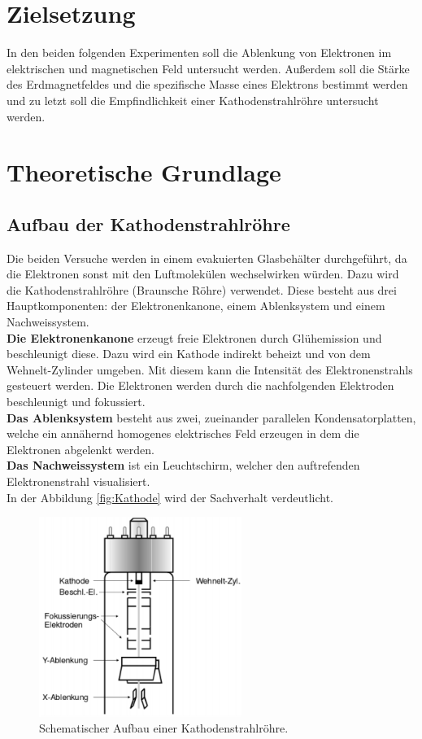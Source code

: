 \section{Zielsetzung}
In den beiden folgenden Experimenten soll die Ablenkung von Elektronen im elektrischen und magnetischen Feld untersucht werden. Außerdem soll die Stärke des Erdmagnetfeldes und die spezifische Masse eines Elektrons bestimmt werden und zu letzt soll die Empfindlichkeit einer Kathodenstrahlröhre untersucht werden.

\section{Theoretische Grundlage}
\label{sec:Theorie}
\subsection{Aufbau der Kathodenstrahlröhre}
Die beiden Versuche werden in einem evakuierten Glasbehälter durchgeführt, da die Elektronen sonst mit den Luftmolekülen wechselwirken würden. Dazu wird die Kathodenstrahlröhre (Braunsche Röhre) verwendet. Diese besteht aus drei Hauptkomponenten: der Elektronenkanone, einem Ablenksystem und einem Nachweissystem.\\
\textbf{Die Elektronenkanone} erzeugt freie Elektronen durch Glühemission und beschleunigt diese. Dazu wird ein Kathode indirekt beheizt und von dem Wehnelt-Zylinder umgeben. Mit diesem kann die Intensität des Elektronenstrahls gesteuert werden. Die Elektronen werden durch die nachfolgenden Elektroden beschleunigt und fokussiert. \\
\textbf{Das Ablenksystem} besteht aus zwei, zueinander parallelen Kondensatorplatten, welche ein annähernd homogenes elektrisches Feld erzeugen in dem die Elektronen abgelenkt werden. \\
\textbf{Das Nachweissystem} ist ein Leuchtschirm, welcher den auftrefenden Elektronenstrahl visualisiert.\\
In der Abbildung \eqref{fig:Kathode} wird der Sachverhalt verdeutlicht.

\begin{figure}[H]
	\centering
	\includegraphics[height=6.5cm]{picture/Kathodenstrahlroehre.PNG}
	\caption{Schematischer Aufbau einer Kathodenstrahlröhre. \cite[2]{V501}}
	\label{fig:Kathode}
\end{figure}


